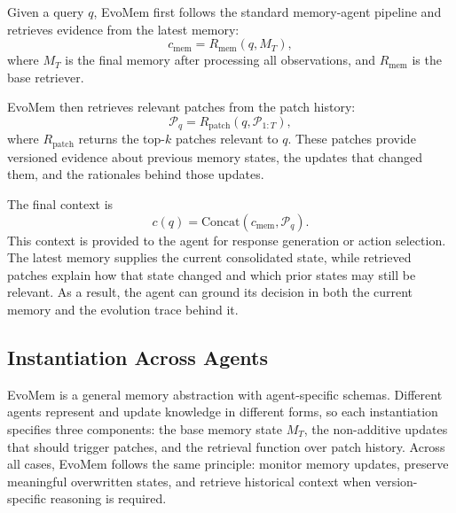 \documentclass{llmxive}
\begin{document}
Given a query $q$, EvoMem first follows the standard memory-agent pipeline and retrieves evidence from the latest memory:
\[
c_{\mathrm{mem}} = R_{\mathrm{mem}}(q, M_T),
\]
where $M_T$ is the final memory after processing all observations, and $R_{\mathrm{mem}}$ is the base retriever.

EvoMem then retrieves relevant patches from the patch history:
\[
\mathcal{P}_q = R_{\mathrm{patch}}(q, \mathcal{P}_{1:T}),
\]
where $R_{\mathrm{patch}}$ returns the top-$k$ patches relevant to $q$. These patches provide versioned evidence about previous memory states, the updates that changed them, and the rationales behind those updates.

The final context is
\[
c(q)=\mathrm{Concat}\left(c_{\mathrm{mem}}, \mathcal{P}_q\right).
\]
This context is provided to the agent for response generation or action selection. The latest memory supplies the current consolidated state, while retrieved patches explain how that state changed and which prior states may still be relevant. As a result, the agent can ground its decision in both the current memory and the evolution trace behind it.













\subsection{Instantiation Across Agents}
\label{sec:instantiation}

EvoMem is a general memory abstraction with agent-specific schemas. Different agents represent and update knowledge in different forms, so each instantiation specifies three components: the base memory state $M_T$, the non-additive updates that should trigger patches, and the retrieval function over patch history. Across all cases, EvoMem follows the same principle: monitor memory updates, preserve meaningful overwritten states, and retrieve historical context when version-specific reasoning is required.
\end{document}
